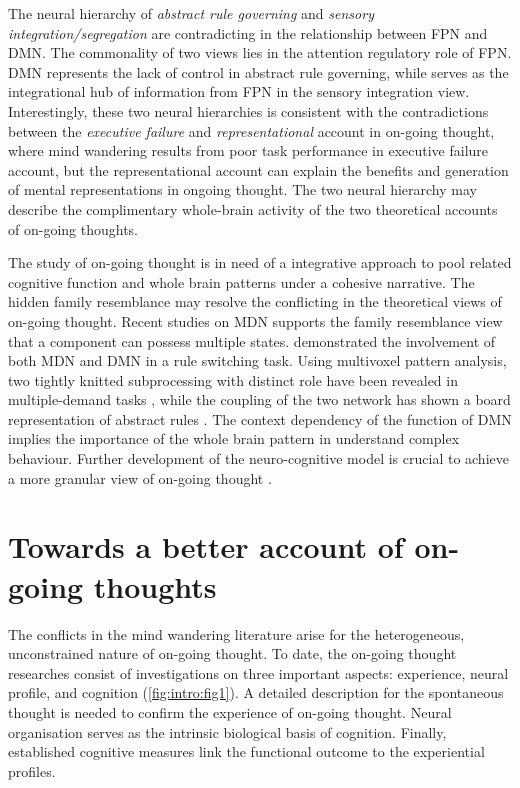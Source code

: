 The neural hierarchy of \textit{abstract rule governing} and \textit{sensory integration/segregation} are contradicting in the relationship between FPN and DMN. The commonality of two views lies in the attention regulatory role of FPN. DMN represents the lack of control in abstract rule governing, while serves as the integrational hub of information from FPN in the sensory integration view. Interestingly, these two neural hierarchies is consistent with the contradictions between the \textit{executive failure} and \textit{representational} account in on-going thought, where mind wandering results from poor task performance in executive failure account, but the representational account can explain the benefits and generation of mental representations in ongoing thought. The two neural hierarchy may describe the complimentary whole-brain activity of the two theoretical accounts of on-going thoughts. 

The study of on-going thought is in need of a integrative approach to pool related cognitive function and whole brain patterns under a cohesive narrative. The hidden family resemblance may resolve the conflicting in the theoretical views of on-going thought. Recent studies on MDN supports the family resemblance view that a component can possess multiple states.  demonstrated the involvement of both MDN and DMN in a rule switching task. Using multivoxel pattern analysis, two tightly knitted subprocessing with distinct role have been revealed in multiple-demand tasks \cite{Crittenden2015}, while the coupling of the two network has shown a board representation of abstract rules \cite{Crittenden2016}. The context dependency of the function of DMN implies the importance of the whole brain pattern in understand complex behaviour. Further development of the neuro-cognitive model is crucial to achieve a more granular view of on-going thought \cite{Mittner2016,SmallwoodFrontiers2013}. 

\section{Towards a better account of on-going thoughts}

The conflicts in the mind wandering literature arise for the heterogeneous, unconstrained nature of on-going thought. To date, the on-going thought researches consist of investigations on three important aspects: experience, neural profile, and cognition (\cref{fig:intro:fig1}). A detailed description for the spontaneous thought is needed to confirm the experience of on-going thought. Neural organisation serves as the intrinsic biological basis of cognition. Finally, established cognitive measures link the functional outcome to the experiential profiles. 

